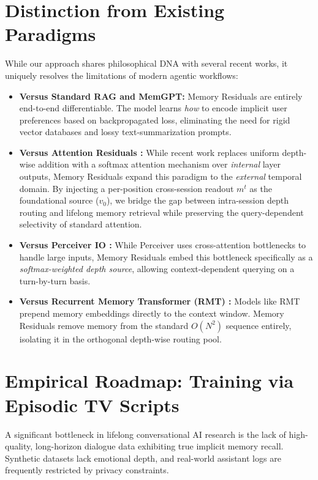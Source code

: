 \documentclass[11pt, a4paper]{article}
\begin{document}
\section{Distinction from Existing Paradigms}
While our approach shares philosophical DNA with several recent works, it uniquely resolves the limitations of modern agentic workflows:
\begin{itemize}
    \item \textbf{Versus Standard RAG and MemGPT:} Memory Residuals are entirely end-to-end differentiable. The model learns \textit{how} to encode implicit user preferences based on backpropagated loss, eliminating the need for rigid vector databases and lossy text-summarization prompts.
    \item \textbf{Versus Attention Residuals \cite{du2026attention}:} While recent work replaces uniform depth-wise addition with a softmax attention mechanism over \textit{internal} layer outputs, Memory Residuals expand this paradigm to the \textit{external} temporal domain. By injecting a per-position cross-session readout $m^t$ as the foundational source ($v_0$), we bridge the gap between intra-session depth routing and lifelong memory retrieval while preserving the query-dependent selectivity of standard attention.
    \item \textbf{Versus Perceiver IO \cite{jaegle2021perceiver}:} While Perceiver uses cross-attention bottlenecks to handle large inputs, Memory Residuals embed this bottleneck specifically as a \textit{softmax-weighted depth source}, allowing context-dependent querying on a turn-by-turn basis.
    \item \textbf{Versus Recurrent Memory Transformer (RMT) \cite{bulatov2022recurrent}:} Models like RMT prepend memory embeddings directly to the context window. Memory Residuals remove memory from the standard $O(N^2)$ sequence entirely, isolating it in the orthogonal depth-wise routing pool.
\end{itemize}

\section{Empirical Roadmap: Training via Episodic TV Scripts}
A significant bottleneck in lifelong conversational AI research is the lack of high-quality, long-horizon dialogue data exhibiting true implicit memory recall. Synthetic datasets lack emotional depth, and real-world assistant logs are frequently restricted by privacy constraints.
\end{document}
